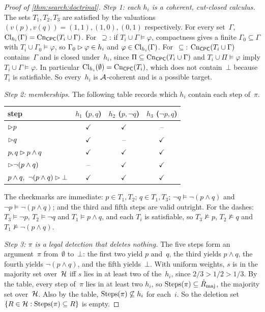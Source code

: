 \begin{proof}[Proof of \cref{thm:search:doctrinal}]
\emph{Step 1: each $h_i$ is a coherent, cut-closed calculus.} The sets $T_1,T_2,T_3$ are satisfied by the valuations $(v(p),v(q))=(1,1),(1,0),(0,1)$ respectively. For every set~$\Gamma$, $\mathrm{Cl}_{h_i}(\Gamma)=\mathrm{Cn}_{\mathsf{CPC}}(T_i\cup\Gamma)$. For~$\supseteq$: if $T_i\cup\Gamma\models\varphi$, compactness gives a finite $\Gamma_0\subseteq\Gamma$ with $T_i\cup\Gamma_0\models\varphi$, so $\Gamma_0\rhd\varphi\in h_i$ and $\varphi\in\mathrm{Cl}_{h_i}(\Gamma)$. For~$\subseteq$: $\mathrm{Cn}_{\mathsf{CPC}}(T_i\cup\Gamma)$ contains~$\Gamma$ and is closed under~$h_i$, since $\Pi\subseteq\mathrm{Cn}_{\mathsf{CPC}}(T_i\cup\Gamma)$ and $T_i\cup\Pi\models\varphi$ imply $T_i\cup\Gamma\models\varphi$. In particular $\mathrm{Cl}_{h_i}(\emptyset)=\mathrm{Cn}_{\mathsf{CPC}}(T_i)$, which does not contain~$\bot$ because $T_i$ is satisfiable. So every~$h_i$ is $\mathcal{A}$-coherent and is a possible target.

\emph{Step 2: memberships.} The following table records which $h_i$ contain each step of~$\pi$.
\begin{center}\small
\begin{tabular}{@{}lccc@{}}
\toprule
step & $h_1$ ($p,q$) & $h_2$ ($p,\neg q$) & $h_3$ ($\neg p,q$)\\
\midrule
$\rhd p$ & $\checkmark$ & $\checkmark$ & -- \\
$\rhd q$ & $\checkmark$ & -- & $\checkmark$ \\
$p,q\rhd p\wedge q$ & $\checkmark$ & $\checkmark$ & $\checkmark$ \\
$\rhd\neg(p\wedge q)$ & -- & $\checkmark$ & $\checkmark$ \\
$p\wedge q,\ \neg(p\wedge q)\step\bot$ & $\checkmark$ & $\checkmark$ & $\checkmark$ \\
\bottomrule
\end{tabular}
\end{center}
The checkmarks are immediate: $p\in T_1,T_2$; $q\in T_1,T_3$; $\neg q\models\neg(p\wedge q)$ and $\neg p\models\neg(p\wedge q)$; and the third and fifth steps are valid outright. For the dashes: $T_3\models\neg p$, $T_2\models\neg q$ and $T_1\models p\wedge q$, and each $T_i$ is satisfiable, so $T_3\not\models p$, $T_2\not\models q$ and $T_1\not\models\neg(p\wedge q)$.

\emph{Step 3: $\pi$ is a legal detection that deletes nothing.} The five steps form an argument~$\pi$ from~$\emptyset$ to~$\bot$: the first two yield $p$ and~$q$, the third yields $p\wedge q$, the fourth yields $\neg(p\wedge q)$, and the fifth yields~$\bot$. With uniform weights, $s$ is in the majority set over~$\mathcal{H}$ iff $s$ lies in at least two of the~$h_i$, since $2/3>1/2>1/3$. By the table, every step of~$\pi$ lies in at least two $h_i$, so $\mathrm{Steps}(\pi)\subseteq\hat R_{\mathrm{maj}}$, the majority set over~$\mathcal{H}$. Also by the table, $\mathrm{Steps}(\pi)\not\subseteq h_i$ for each~$i$. So the deletion set $\{R\in\mathcal{H}:\mathrm{Steps}(\pi)\subseteq R\}$ is empty.


\end{proof}
